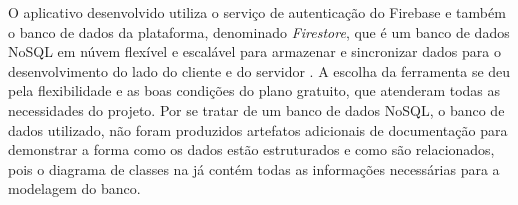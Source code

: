 O aplicativo desenvolvido utiliza o serviço de autenticação do Firebase e também o banco de dados da plataforma, denominado \textit{Firestore}, que é um banco de dados NoSQL em núvem flexível e escalável para armazenar e sincronizar dados para o desenvolvimento do lado do cliente e do servidor \cite{firestore}. A escolha da ferramenta se deu pela flexibilidade e as boas condições do plano gratuito, que atenderam todas as necessidades do projeto. Por se tratar de um banco de dados NoSQL, o banco de dados utilizado, não foram produzidos artefatos adicionais de documentação para demonstrar a forma como os dados estão estruturados e como são relacionados, pois o diagrama de classes na  já contém todas as informações necessárias para a modelagem do banco.
